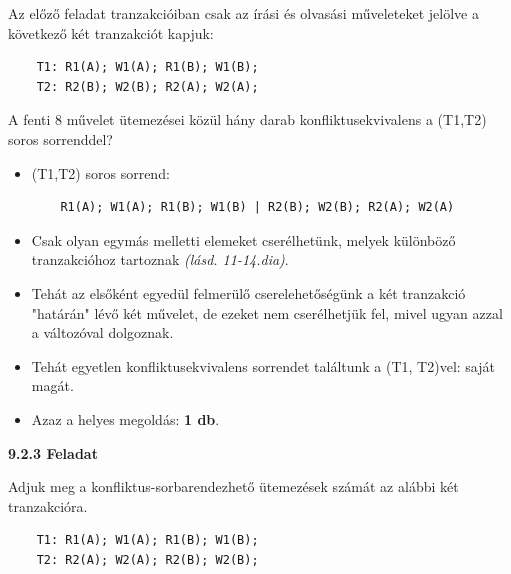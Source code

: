 \documentclass[a4paper,11.5pt, table]{article}
\begin{document}
	Az előző feladat tranzakcióiban csak az írási és olvasási műveleteket jelölve a következő két tranzakciót kapjuk:
	\begin{lstlisting}
	T1: R1(A); W1(A); R1(B); W1(B);
	T2: R2(B); W2(B); R2(A); W2(A);
	\end{lstlisting}
	A fenti 8 művelet ütemezései közül hány darab konfliktusekvivalens a (T1,T2) soros sorrenddel? 
	\begin{itemize}
		\item (T1,T2) soros sorrend:
		\begin{lstlisting}
	R1(A); W1(A); R1(B); W1(B) | R2(B); W2(B); R2(A); W2(A)
		\end{lstlisting}
		
		\item Csak olyan egymás melletti elemeket cserélhetünk, melyek különböző tranzakcióhoz tartoznak \textit{(lásd. 11-14.dia)}. 
		\item Tehát az elsőként egyedül felmerülő cserelehetőségünk a két tranzakció "határán" lévő két művelet, de ezeket nem cserélhetjük fel, mivel ugyan azzal a változóval dolgoznak.
		\item Tehát egyetlen konfliktusekvivalens sorrendet találtunk a (T1, T2)vel: saját magát.
		\item Azaz a helyes megoldás: \textbf{1 db}.
	\end{itemize}
	
	{\large \textbf{9.2.3 Feladat}}
	
	Adjuk meg a konfliktus-sorbarendezhető ütemezések számát az alábbi két tranzakcióra.
	\begin{lstlisting}
	T1: R1(A); W1(A); R1(B); W1(B);
	T2: R2(A); W2(A); R2(B); W2(B);
	\end{lstlisting}
	
\end{document}
